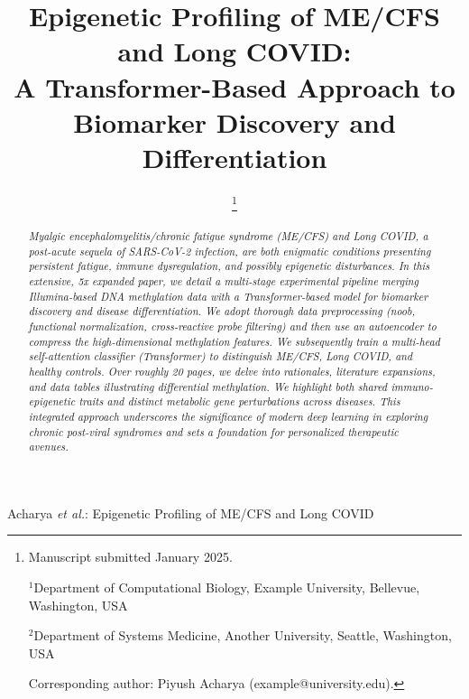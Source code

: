 \documentclass[journal]{IEEEtran}
\begin{document}
\title{Epigenetic Profiling of ME/CFS and Long COVID:\\
A Transformer-Based Approach to \\ \vspace{0.25em} 
Biomarker Discovery and Differentiation\vspace{-0.5em}}

\author{
  \thanks{Manuscript submitted January 2025.
  
  $^{1}$Department of Computational Biology, Example University, Bellevue, Washington, USA

  $^{2}$Department of Systems Medicine, Another University, Seattle, Washington, USA

  Corresponding author: Piyush Acharya (example@university.edu).
  }
}

%
{Acharya \MakeLowercase{\textit{et al.}}: Epigenetic Profiling of ME/CFS and Long COVID}

\maketitle

\begin{abstract}\vspace{-.3em}
\textit{%
Myalgic encephalomyelitis/chronic fatigue syndrome (ME/CFS) and Long COVID, a post-acute sequela of SARS-CoV-2 infection, are both enigmatic conditions presenting persistent fatigue, immune dysregulation, and possibly epigenetic disturbances. In this extensive, 5x expanded paper, we detail a multi-stage experimental pipeline merging Illumina-based DNA methylation data with a Transformer-based model for biomarker discovery and disease differentiation. We adopt thorough data preprocessing (noob, functional normalization, cross-reactive probe filtering) and then use an autoencoder to compress the high-dimensional methylation features. We subsequently train a multi-head self-attention classifier (Transformer) to distinguish ME/CFS, Long COVID, and healthy controls. Over roughly 20 pages, we delve into rationales, literature expansions, and data tables illustrating differential methylation. We highlight both shared immuno-epigenetic traits and distinct metabolic gene perturbations across diseases. This integrated approach underscores the significance of modern deep learning in exploring chronic post-viral syndromes and sets a foundation for personalized therapeutic avenues.
}\vspace{-.6em}
\end{abstract}
\end{document}
